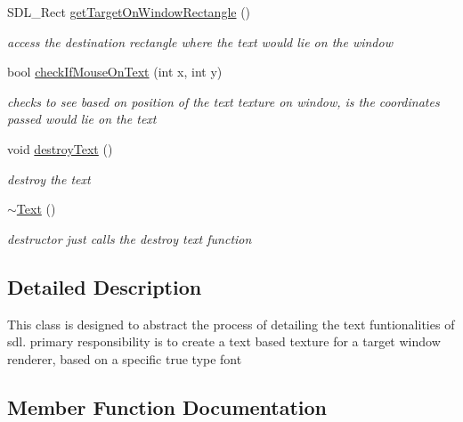 \begin{DoxyCompactItemize}
\hypertarget{class_text_af1bff0c622ed9e80f80789a069413c61}{}\label{class_text_af1bff0c622ed9e80f80789a069413c61} 
S\+D\+L\+\_\+\+Rect \hyperlink{class_text_af1bff0c622ed9e80f80789a069413c61}{get\+Target\+On\+Window\+Rectangle} ()
\begin{DoxyCompactList}\small\item\em access the destination rectangle where the text would lie on the window \end{DoxyCompactList}\item 
\hypertarget{class_text_aa4d27f2c2e93457c19551e95bd9c76ce}{}\label{class_text_aa4d27f2c2e93457c19551e95bd9c76ce} 
bool \hyperlink{class_text_aa4d27f2c2e93457c19551e95bd9c76ce}{check\+If\+Mouse\+On\+Text} (int x, int y)
\begin{DoxyCompactList}\small\item\em checks to see based on position of the text texture on window, is the coordinates passed would lie on the text \end{DoxyCompactList}\item 
\hypertarget{class_text_a3abfb2a983bca804645361e40ba7c389}{}\label{class_text_a3abfb2a983bca804645361e40ba7c389} 
void \hyperlink{class_text_a3abfb2a983bca804645361e40ba7c389}{destroy\+Text} ()
\begin{DoxyCompactList}\small\item\em destroy the text \end{DoxyCompactList}\item 
\hypertarget{class_text_a2d49e5c280e205125b149f7777ae30c7}{}\label{class_text_a2d49e5c280e205125b149f7777ae30c7} 
\hyperlink{class_text_a2d49e5c280e205125b149f7777ae30c7}{$\sim$\+Text} ()
\begin{DoxyCompactList}\small\item\em destructor just calls the destroy text function \end{DoxyCompactList}\end{DoxyCompactItemize}


\subsection{Detailed Description}
This class is designed to abstract the process of detailing the text funtionalities of sdl. primary responsibility is to create a text based texture for a target window renderer, based on a specific true type font 

\subsection{Member Function Documentation}
\hypertarget{class_text_aaef691045004d8c9ad3106d43421d46e}{}\label{class_text_aaef691045004d8c9ad3106d43421d46e} 
